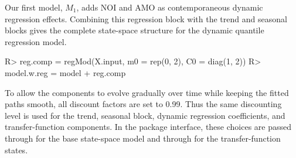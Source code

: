 \documentclass[jss]{jss}
\begin{document}
Our first model, \(M_1\), adds NOI and AMO as contemporaneous dynamic regression effects. Combining this regression block with the trend and seasonal blocks gives the complete state-space structure for the dynamic quantile regression model.
\begin{CodeChunk}
\begin{CodeInput}
R> reg.comp = regMod(X.input, m0 = rep(0, 2), C0 = diag(1, 2))
R> model.w.reg = model + reg.comp
\end{CodeInput}
\end{CodeChunk}

To allow the components to evolve gradually over time while keeping the fitted paths smooth, all discount factors are set to 0.99. Thus the same discounting level is used for the trend, seasonal block, dynamic regression coefficients, and transfer-function components. In the package interface, these choices are passed through  for the base state-space model and through  for the transfer-function states.
\end{document}
